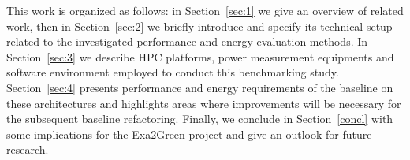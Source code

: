 This work is  organized as follows: in Section~\ref{sec:1}  we give an
overview  of  related work,  then  in  Section~\ref{sec:2} we  briefly
introduce  \cosmoart and specify  its technical  setup related  to the
investigated   performance   and   energy  evaluation   methods.    In
Section~\ref{sec:3}  we  describe  HPC  platforms,  power  measurement
equipments   and  software  environment   employed  to   conduct  this
benchmarking  study.   Section~\ref{sec:4}  presents  performance  and
energy  requirements  of  the  baseline  on  these  architectures  and
highlights  areas  where  improvements   will  be  necessary  for  the
subsequent   baseline   refactoring.     Finally,   we   conclude   in
Section~\ref{concl} with  some implications for  the Exa2Green project
and give an outlook for future research.

